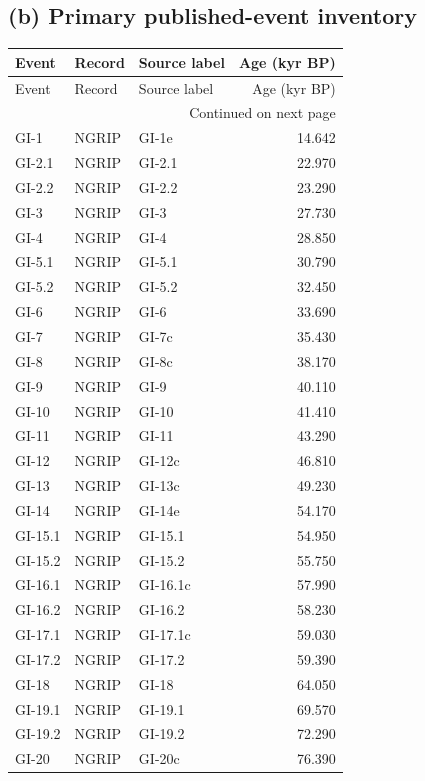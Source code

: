 \subsection*{(b) Primary published-event inventory}
{\small
\begin{longtable}{lllr}
\toprule
Event & Record & Source label & Age (kyr BP) \\
\midrule
\endfirsthead
\toprule
Event & Record & Source label & Age (kyr BP) \\
\midrule
\endhead
\midrule
\multicolumn{4}{r}{Continued on next page} \\
\midrule
\endfoot
\bottomrule
\endlastfoot
GI-1 & NGRIP & GI-1e & 14.642 \\
GI-2.1 & NGRIP & GI-2.1 & 22.970 \\
GI-2.2 & NGRIP & GI-2.2 & 23.290 \\
GI-3 & NGRIP & GI-3 & 27.730 \\
GI-4 & NGRIP & GI-4 & 28.850 \\
GI-5.1 & NGRIP & GI-5.1 & 30.790 \\
GI-5.2 & NGRIP & GI-5.2 & 32.450 \\
GI-6 & NGRIP & GI-6 & 33.690 \\
GI-7 & NGRIP & GI-7c & 35.430 \\
GI-8 & NGRIP & GI-8c & 38.170 \\
GI-9 & NGRIP & GI-9 & 40.110 \\
GI-10 & NGRIP & GI-10 & 41.410 \\
GI-11 & NGRIP & GI-11 & 43.290 \\
GI-12 & NGRIP & GI-12c & 46.810 \\
GI-13 & NGRIP & GI-13c & 49.230 \\
GI-14 & NGRIP & GI-14e & 54.170 \\
GI-15.1 & NGRIP & GI-15.1 & 54.950 \\
GI-15.2 & NGRIP & GI-15.2 & 55.750 \\
GI-16.1 & NGRIP & GI-16.1c & 57.990 \\
GI-16.2 & NGRIP & GI-16.2 & 58.230 \\
GI-17.1 & NGRIP & GI-17.1c & 59.030 \\
GI-17.2 & NGRIP & GI-17.2 & 59.390 \\
GI-18 & NGRIP & GI-18 & 64.050 \\
GI-19.1 & NGRIP & GI-19.1 & 69.570 \\
GI-19.2 & NGRIP & GI-19.2 & 72.290 \\
GI-20 & NGRIP & GI-20c & 76.390 \\

\end{longtable}}
